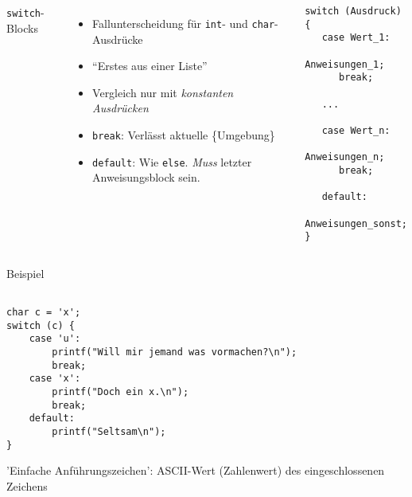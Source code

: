 \begin{frame}[fragile]
%
\begin{columns}[T]
\begin{Large}
{\texttt{switch}-Blocks}
\vspace{6pt}
\end{Large}
\begin{itemize}
\item Fallunterscheidung für \texttt{int}- und \texttt{char}-Ausdrücke
\item \enquote{Erstes aus einer Liste}
\item Vergleich nur mit \emph{konstanten Ausdrücken}
\item \texttt{break}: Verlässt aktuelle \{Umgebung\}
\item \texttt{default}: Wie \texttt{else}.\newline
	\emph{Muss} letzter Anweisungsblock sein.
\end{itemize}
%
\begin{codebox}[Syntax]
\begin{verbatim}
switch (Ausdruck) {
   case Wert_1:
      Anweisungen_1;
      break;

   ...

   case Wert_n:
      Anweisungen_n;
      break;
      
   default:
      Anweisungen_sonst;
}
\end{verbatim}
\end{codebox}
\end{columns}
%
\end{frame}


\begin{frame}[fragile]{Beispiel}
%
\begin{codebox}
\begin{verbatim}

char c = 'x';
switch (c) {
    case 'u':
        printf("Will mir jemand was vormachen?\n");
        break;
    case 'x':
        printf("Doch ein x.\n");
        break;
    default:
        printf("Seltsam\n");
}
\end{verbatim}
\end{codebox}
%
\begin{hintbox}
\small 'Einfache Anführungszeichen': ASCII-Wert (Zahlenwert) des eingeschlossenen Zeichens
\end{hintbox}
%
\end{frame}
